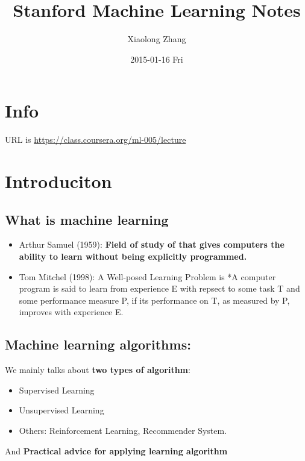 \documentclass[11pt]{article}
\author{Xiaolong Zhang}
\date{2015-01-16 Fri}
\title{Stanford Machine Learning Notes}
\begin{document}
\maketitle
\section*{Info}
\label{sec-1}
URL is \url{https://class.coursera.org/ml-005/lecture}

\section*{Introduciton}
\label{sec-2}
\subsection*{What is machine learning}
\label{sec-2-1}
\begin{itemize}
\item Arthur Samuel (1959): \textbf{Field of study of that gives computers the ability to learn without being explicitly programmed.}
\item Tom Mitchel (1998): A Well-posed Learning Problem is *A computer program is said to learn from experience E with repsect to some task T and some performance measure P, if its performance on T, as measured by P, improves with experience E.
\end{itemize}
\subsection*{Machine learning algorithms:}
\label{sec-2-2}
We mainly talks about \textbf{two types of algorithm}:
\begin{itemize}
\item Supervised Learning
\item Unsupervised Learning
\item Others: Reinforcement Learning, Recommender System.
\end{itemize}
And \textbf{Practical advice for applying learning algorithm}
\end{document}
